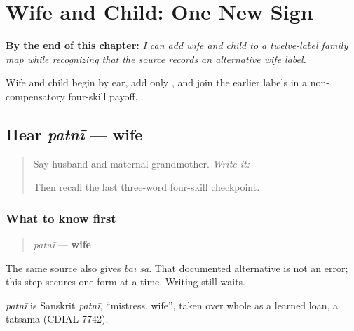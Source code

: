 
\chapter{Wife and Child: One New Sign}
\label{ch:mw-family-twelve}

\begin{chapteropening}
\textbf{By the end of this chapter:} \emph{I can add wife and child to a twelve-label family map while recognizing that the source records an alternative wife label.}

Wife and child begin by ear, add only , and join the earlier labels in a non-compensatory four-skill payoff.
\end{chapteropening}

\section[patnī]{Hear \emph{patnī} — wife}

\label{lesson:MW-C09-hear-patni}



\begin{quote}
Say husband and maternal grandmother. \emph{Write it:} \textbf{}

Then recall the last three-word four-skill checkpoint.
\end{quote}

\subsection*{What to know first}
\begin{quote}
\emph{patnī} — \textbf{wife}
\end{quote}

The same source also gives \emph{bāī sā}. That documented alternative is not an error; this step secures one form at a time. Writing still waits.

\begin{cousinweb}
\emph{patnī} is Sanskrit \emph{patnī}, \textquotedblleft{}mistress, wife\textquotedblright{}, taken over whole as a learned loan, a tatsama (CDIAL 7742).
\end{cousinweb}

